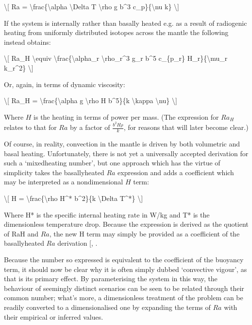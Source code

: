 \documentclass[letterpaper,10pt,english]{jupyterBook}
\begin{document}
\sphinxAtStartPar
\textbackslash{}{[} Ra = \textbackslash{}frac\{\textbackslash{}alpha \textbackslash{}Delta T \textbackslash{}rho g b\textasciicircum{}3 c\_p\}\{\textbackslash{}nu k\} \textbackslash{}{]}

\sphinxAtStartPar
If the system is internally rather than basally heated \sphinxhyphen{} e.g. as a result of radiogenic heating from uniformly distributed isotopes across the mantle \sphinxhyphen{} the following instead obtains:

\sphinxAtStartPar
\textbackslash{}{[} Ra\_H \textbackslash{}equiv \textbackslash{}frac\{\textbackslash{}alpha\_r \textbackslash{}rho\_r\textasciicircum{}3 g\_r b\textasciicircum{}5 c\_\{p\_r\} H\_r\}\{\textbackslash{}mu\_r k\_r\textasciicircum{}2\} \textbackslash{}{]}

\sphinxAtStartPar
Or, again, in terms of dynamic viscosity:

\sphinxAtStartPar
\textbackslash{}{[} Ra\_H = \textbackslash{}frac\{\textbackslash{}alpha g \textbackslash{}rho H b\textasciicircum{}5\}\{k \textbackslash{}kappa \textbackslash{}nu\} \textbackslash{}{]}

\sphinxAtStartPar
Where \(H\) is the heating in terms of power per mass. (The expression for \(Ra_H\) relates to that for \(Ra\) by a factor of \(\frac{b^2 H \rho}{k}\), for reasons that will later become clear.)

\sphinxAtStartPar
Of course, in reality, convection in the mantle is driven by both volumetric and basal heating. Unfortunately, there is not yet a universally accepted derivation for such a ‘mixed\sphinxhyphen{}heating  number’, but one approach which has the virtue of simplicity takes the basally\sphinxhyphen{}heated \(Ra\) expression and adds a coefficient which may be interpreted as a non\sphinxhyphen{}dimensional \(H\) term:

\sphinxAtStartPar
\textbackslash{}{[} H = \textbackslash{}frac\{\textbackslash{}rho H\textasciicircum{}* b\textasciicircum{}2\}\{k \textbackslash{}Delta T\textasciicircum{}*\} \textbackslash{}{]}

\sphinxAtStartPar
Where H* is the specific internal heating rate in W/kg and T* is the dimensionless temperature drop. Because the expression is derived as the quotient of RaH and \(Ra\), the new H term may simply be provided as a coefficient of the basally\sphinxhyphen{}heated \(Ra\) derivation {[}, \sphinxcite{references:id89}{]}.

\sphinxAtStartPar
Because the  number so expressed is equivalent to the coefficient of the buoyancy term, it should now be clear why it is often simply dubbed ‘convective vigour’, as that is its primary effect. By parameterising the system in this way, the behaviour of seemingly distinct scenarios can be seen to be related through their common  number; what’s more, a dimensionless treatment of the problem can be readily converted to a dimensionalised one by expanding the terms of \(Ra\) with their empirical or inferred values.
\end{document}
